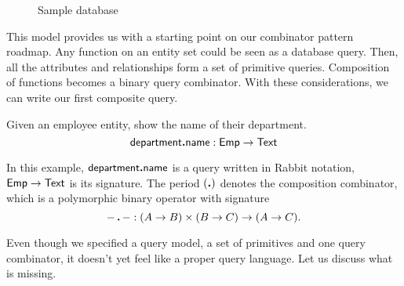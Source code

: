 \begin{figure}
    \centering
    \caption{Sample database}
    \label{fig:sample-schema}
\end{figure}

This model provides us with a starting point on our combinator pattern roadmap.
Any function on an entity set could be seen as a database query.  Then, all the
attributes and relationships form a set of primitive queries.  Composition of
functions becomes a binary query combinator.  With these considerations, we can
write our first composite query.

\begin{example}
    Given an employee entity, show the name of their department.
    \begin{equation*}
        \textup{\textsf{department}}\boldsymbol{.}\textup{\textsf{name}}: \textup{\textsf{Emp}} \to \textup{\textsf{Text}}
    \end{equation*}
\end{example}

In this example, $\textup{\textsf{department}}\boldsymbol{.}\textup{\textsf{name}}$ is a query written in Rabbit notation,
$\textup{\textsf{Emp}} \to \textup{\textsf{Text}}$ is its signature.  The period $(\boldsymbol{.})$ denotes the composition
combinator, which is a polymorphic binary operator with signature
\begin{equation*}
        -\,\boldsymbol{.}\,- : (A \to B) \times (B \to C) \to (A \to C).
\end{equation*}

Even though we specified a query model, a set of primitives and one query
combinator, it doesn't yet feel like a proper query language.  Let us discuss
what is missing.

